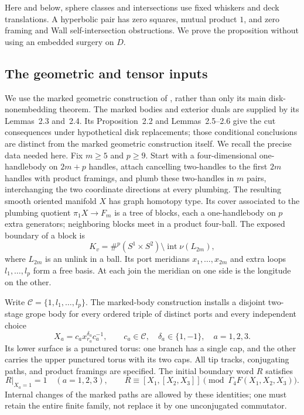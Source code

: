 \documentclass[11pt]{article}
\theoremstyle{definition}
\theoremstyle{remark}
\begin{document}
Here and below, sphere classes and intersections use fixed whiskers and
deck translations.  A hyperbolic pair has zero squares, mutual product
$1$, and zero framing and Wall self-intersection obstructions.  We prove
the proposition without using an embedded surgery on $D$.

\subsection{The geometric and tensor inputs}
\label{ch:inputs}

We use the marked geometric construction of \cite[Section~2]{TO}, rather
than only its main disk-nonembedding theorem. The marked bodies and
exterior duals are supplied by its Lemmas~2.3 and~2.4. Its
Proposition~2.2 and Lemmas~2.5--2.6 give the cut consequences under
hypothetical disk replacements; those conditional conclusions are
distinct from the marked geometric construction itself.
We recall the precise data needed here.
Fix $m\geq5$ and $p\geq9$.  Start with a four-dimensional one-handlebody
on $2m+p$ handles, attach cancelling two-handles to the first $2m$
handles with product framings, and plumb these two-handles in $m$ pairs,
interchanging the two coordinate directions at every plumbing.
The resulting smooth oriented manifold $X$ has graph homotopy type.
Its cover associated to the plumbing quotient $\pi_1X\to F_m$ is a
tree of blocks, each a one-handlebody on $p$ extra generators; neighboring
blocks meet in a product four-ball.  The exposed boundary of a block is
\[
 K_v=\#^p(S^1\times S^2)\setminus
       \operatorname{int}\nu(L_{2m}),
\]
where $L_{2m}$ is an unlink in a ball.  Its port meridians
$x_1,\ldots,x_{2m}$ and extra loops $l_1,\ldots,l_p$ form a free basis.
At each join the meridian on one side is the longitude on the other.

Write $\mathcal C=\{1,l_1,\ldots,l_p\}$.  The marked-body construction
installs a disjoint two-stage grope body for every ordered triple of
distinct ports and every independent choice
\[
 X_a=c_a x_{r_a}^{\delta_a}c_a^{-1},\qquad
 c_a\in\mathcal C,\quad \delta_a\in\{1,-1\},\quad a=1,2,3.
\]
Its lower surface is a punctured torus: one branch has a single cap,
and the other carries the upper punctured torus with its two caps.
All tip tracks, conjugating paths, and product framings are specified.
The initial boundary word $R$ satisfies
\begin{equation}
\label{ch:laws}
 R|_{X_a=1}=1\quad(a=1,2,3),\qquad
 R\equiv[X_1,[X_2,X_3]]\pmod{\Gamma_4F(X_1,X_2,X_3)}.
\end{equation}
Internal changes of the marked paths are allowed by these identities;
one must retain the entire finite family, not replace it by one
unconjugated commutator.
\end{document}
